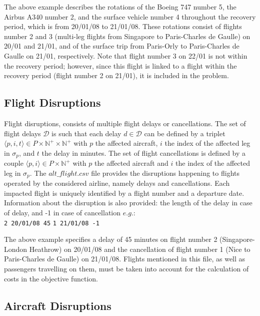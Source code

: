 \documentclass[ijoo,nonblindrev]{informs-ijoo}
\begin{document}
The above example describes the rotations of the Boeing 747 number 5, the Airbus A340 number 2, and the surface vehicle number 4 throughout the recovery period, which is from 20/01/08 to 21/01/08. These rotations consist of flights number 2 and 3 (multi-leg flights from Singapore to Paris-Charles de Gaulle) on 20/01 and 21/01, and of the surface trip from Paris-Orly to Paris-Charles de Gaulle on 21/01, respectively. Note that flight number 3 on 22/01 is not within the recovery period; however, since this flight is linked to a flight within the recovery period (flight number 2 on 21/01), it is included in the problem.

\subsection{Flight Disruptions} \label{subsec:flightDisr}


	Flight disruptions, consists of multiple flight delays or cancellations. The set of flight delays $ \mathcal{D} $ is such that each delay $ d \in \mathcal{D}$ can be defined by a triplet $\langle p, i, t \rangle \in P \times \mathbb{N}^{+}  \times \mathbb{N}^{+}$ with $p$ the affected aircraft, $i$ the index of the affected leg in $ \sigma_p$, and $t$ the delay in minutes. The set of flight cancellations is defined by a couple $\langle p,i \rangle \in  P \times \mathbb{N}^{+}$ with $p$ the affected aircraft and $i$ the index of the affected leg in $ \sigma_p$.
	The $alt\_flight.csv$ file provides the disruptions happening to flights operated by the considered airline, namely delays and cancellations. Each impacted flight is uniquely identified by a flight number and a departure date. Information about the disruption is also provided: the length of the delay in case of delay, and -1 in
	case of cancellation $e.g.$:\\
	\newline
	{\texttt{\footnotesize 2 20/01/08 45}}
	\newline
	{\texttt{\footnotesize 1 21/01/08 -1}}
	\newline
	
	The above example specifies a delay of 45 minutes on flight number 2 (Singapore-London Heathrow) on 20/01/08 and the cancellation of flight number 1 (Nice to Paris-Charles de Gaulle) on 21/01/08.
	Flights mentioned in this file, as well as passengers travelling on them, must be taken into account for the calculation of costs in the objective function.
	
\subsection{Aircraft Disruptions} \label{subsec:aircraftDisr}
\end{document}
